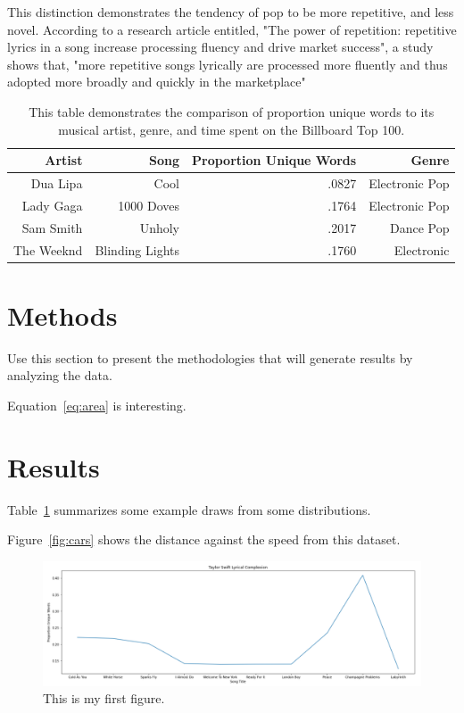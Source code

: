 \documentclass[12pt]{article}
\begin{document}
This distinction demonstrates the tendency of pop to be more repetitive, and less novel. According to a research article entitled, "The power of repetition: repetitive lyrics in a song increase processing fluency and drive market success", a study shows that, "more repetitive songs lyrically are processed more fluently and thus adopted more broadly and quickly in the marketplace" \citep{Nunes2015power} 



\begin{table}[tbp]
  \caption{This table demonstrates the comparison of proportion unique words to its musical artist, genre, and time spent on the Billboard Top 100.}
  \label{tab:rv}
\centering
\begin{tabular}{rrrr}
  \toprule
Artist & Song & Proportion Unique Words & Genre \\ 
  \midrule
Dua Lipa & Cool & .0827 & Electronic Pop \\ 
  Lady Gaga & 1000 Doves  & .1764 & Electronic Pop \\ 
  Sam Smith & Unholy & .2017 & Dance Pop \\ 
  The Weeknd & Blinding Lights & .1760 & Electronic \\ 
     \bottomrule
\end{tabular}
\end{table}




\section{Methods}
\label{sec:meth}

Use this section to present the methodologies that will generate results by
analyzing the data.

Equation~\eqref{eq:area} is interesting. 



\section{Results}
\label{sec:resu}

Table~\ref{tab:rv} summarizes some example draws from some distributions.


Figure~\ref{fig:cars} shows the distance against the speed from this dataset.


\begin{figure}[htbp]
  \centering
  \includegraphics[width=\textwidth]{graph.png}
  \caption{This is my first figure.}
  \label{fig:graph}
\end{figure}
\end{document}
